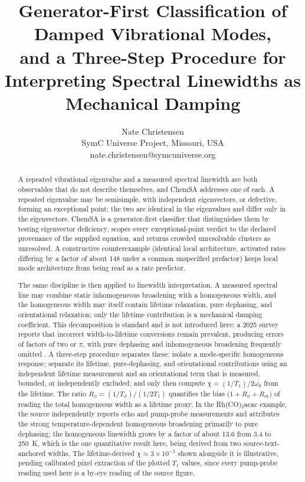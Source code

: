 \documentclass[11pt]{article}
\title{Generator-First Classification of Damped Vibrational Modes,\\
and a Three-Step Procedure for Interpreting Spectral Linewidths as Mechanical Damping}
\author{Nate Christensen\\ SymC Universe Project, Missouri, USA\\ nate.christensen@symcuniverse.org}
\date{}
\begin{document}
\maketitle

\begin{abstract}
A repeated vibrational eigenvalue and a measured spectral linewidth are both observables that do not describe themselves, and ChemSA addresses one of each. A repeated eigenvalue may be semisimple, with independent eigenvectors, or defective, forming an exceptional point; the two are identical in the eigenvalues and differ only in the eigenvectors. ChemSA is a generator-first classifier that distinguishes them by testing eigenvector deficiency, scopes every exceptional-point verdict to the declared provenance of the supplied equation, and returns crowded unresolvable clusters as unresolved. A constructive counterexample (identical local architecture, activated rates differing by a factor of about 148 under a common unspecified prefactor) keeps local mode architecture from being read as a rate predictor.

The same discipline is then applied to linewidth interpretation. A measured spectral line may combine static inhomogeneous broadening with a homogeneous width, and the homogeneous width may itself contain lifetime relaxation, pure dephasing, and orientational relaxation; only the lifetime contribution is a mechanical damping coefficient. This decomposition is standard and is not introduced here; a 2025 survey reports that incorrect width-to-lifetime conversions remain prevalent, producing errors of factors of two or \(\pi\), with pure dephasing and inhomogeneous broadening frequently omitted \citep{dubajic2025}. A three-step procedure separates these: isolate a mode-specific homogeneous response; separate its lifetime, pure-dephasing, and orientational contributions using an independent lifetime measurement and an orientational term that is measured, bounded, or independently excluded; and only then compute $\chi = (1/T_1)/2\omega_0$ from the lifetime. The ratio $R_\phi = (1/T_\phi)/(1/2T_1)$ quantifies the bias ($1 + R_\phi + R_{\mathrm{or}}$) of reading the total homogeneous width as a lifetime proxy. In the Rh(CO)$_2$acac example, the source independently reports echo and pump-probe measurements and attributes the strong temperature-dependent homogeneous broadening primarily to pure dephasing; the homogeneous linewidth grows by a factor of about 13.6 from 3.4 to 250~K, which is the one quantitative result here, being derived from two source-text-anchored widths. The lifetime-derived $\chi \approx 3\times10^{-5}$ shown alongside it is illustrative, pending calibrated pixel extraction of the plotted $T_1$ values, since every pump-probe reading used here is a by-eye reading of the source figure.
\end{abstract}
\end{document}
